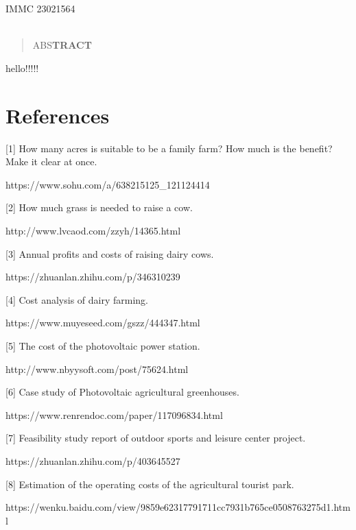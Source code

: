 \documentclass[12pt]{article}
\begin{document}
\newpage

\begin{center}
	\Huge
	~\\
	~\\
	IMMC 23021564
	~\\
	~\\
	\normalsize
\end{center}

\begin{abstract}
	ABS\textbf{TRACT}
\end{abstract}

\newpage
\tableofcontents
\newpage

hello!!!!!

\section{References}

[1] How many acres is suitable to be a family farm? How much is the benefit? Make it clear at once. 

https://www.sohu.com/a/638215125\_121124414

[2] How much grass is needed to raise a cow. 

http://www.lvcaod.com/zzyh/14365.html

[3] Annual profits and costs of raising dairy cows. 

https://zhuanlan.zhihu.com/p/346310239

[4] Cost analysis of dairy farming. 

https://www.muyeseed.com/gszz/444347.html

[5] The cost of the photovoltaic power station. 

http://www.nbyysoft.com/post/75624.html

[6] Case study of Photovoltaic agricultural greenhouses. 

https://www.renrendoc.com/paper/117096834.html

[7] Feasibility study report of outdoor sports and leisure center project. 

https://zhuanlan.zhihu.com/p/403645527

[8] Estimation of the operating costs of the agricultural tourist park.  

https://wenku.baidu.com/view/9859e62317791711cc7931b765ce0508763275d1.html
\end{document}

